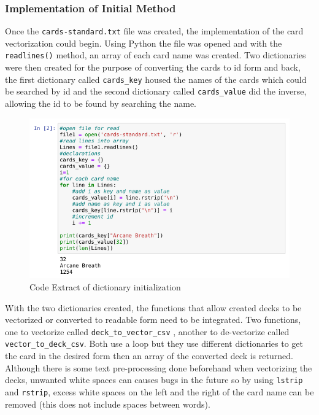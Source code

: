 \documentclass{report} %
\begin{document}
\subsubsection{Implementation of Initial Method}
Once the \nolinkurl{cards-standard.txt} file was created, the implementation of the card vectorization could begin. Using Python the file was opened and with the \nolinkurl{readlines()} method, an array of each card name was created. Two dictionaries were then created for the purpose of converting the cards to id form and back, the first dictionary called \nolinkurl{cards_key} housed the names of the cards which could be searched by id and the second dictionary called \nolinkurl{cards_value} did the inverse, allowing the id to be found by searching the name.

\begin{figure}[H]
\centering
\includegraphics[width=1\textwidth]{InitialFileRead}
\caption{Code Extract of dictionary initialization\protect}
 \label{board}
\end{figure}

With the two dictionaries created, the functions that allow created decks to be vectorized or converted to readable form need to be integrated. Two functions, one to vectorize called \nolinkurl{deck_to_vector_csv} , another to de-vectorize called \nolinkurl{vector_to_deck_csv}. Both use a loop but they use different dictionaries to get the card in the desired form then an array of the converted deck is returned. Although there is some text pre-processing done beforehand when vectorizing the decks, unwanted white spaces can causes bugs in the future so by using \nolinkurl{lstrip} and \nolinkurl{rstrip}, excess white spaces on the left and the right of the card name can be removed (this does not include spaces between words).
\end{document}
